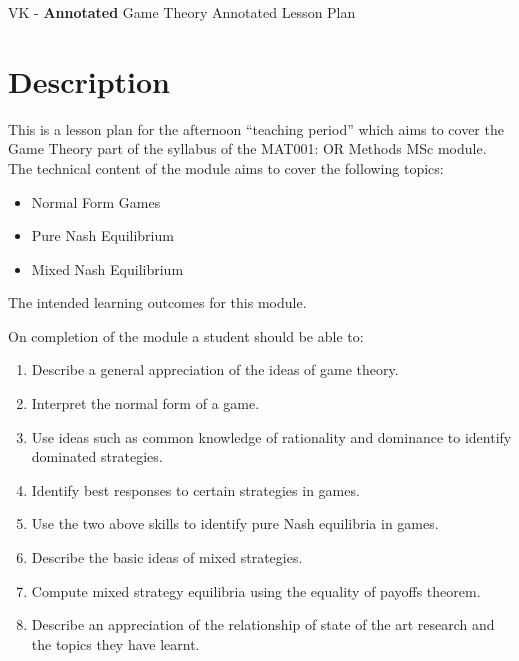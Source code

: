 \documentclass[12pt,a4paper]{article}
\begin{document}
\begin{center}
\Huge{VK - \textbf{Annotated} Game Theory Annotated Lesson Plan}
\end{center}

\section{Description}

This is a lesson plan for the afternoon ``teaching period'' which aims to cover the Game Theory part of the syllabus of the MAT001: OR Methods MSc module.
The technical content of the module aims to cover the following topics:

\begin{itemize}
\item Normal Form Games
\item Pure Nash Equilibrium
\item Mixed Nash Equilibrium
\end{itemize}

The intended learning outcomes for this module.

On completion of the module a student should be able to:

\begin{enumerate}[label=\Alph*]
\item Describe a general appreciation of the ideas of game theory.
\item Interpret the normal form of a game.
\item Use ideas such as common knowledge of rationality and dominance to identify dominated strategies.
\item Identify best responses to certain strategies in games.
\item Use the two above skills to identify pure Nash equilibria in games.
\item Describe the basic ideas of mixed strategies.
\item Compute mixed strategy equilibria using the equality of payoffs theorem.
\item Describe an appreciation of the relationship of state of the art research and the topics they have learnt.
\end{enumerate}
\end{document}
